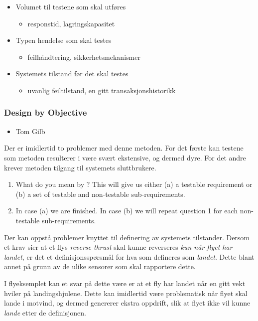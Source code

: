 \begin{itemize}
\item
  Volumet til testene som skal utføres
  \begin{itemize}
  \item
    responstid, lagringskapasitet
  \end{itemize}
\item
  Typen hendelse som skal testes
  \begin{itemize}
  \item
    feilhåndtering, sikkerhetsmekanismer
  \end{itemize}
\item
  Systemets tilstand før det skal testes
  \begin{itemize}
  \item
    uvanlig feiltilstand, en gitt transaksjonshistorikk
  \end{itemize}
\end{itemize}
\subsubsection{Design by Objective}

\begin{itemize}
\item
  Tom Gilb
\end{itemize}
Der er imidlertid to problemer med denne metoden. For det første kan
testene som metoden resulterer i være svært ekstensive, og dermed dyre.
For det andre krever metoden tilgang til systemets sluttbrukere.

\begin{enumerate}[1.]
\item
  What do you mean by ? This will give us either (a) a testable
  requirement or (b) a set of testable and non-testable
  sub-requirements.
\item
  In case (a) we are finished. In case (b) we will repeat question 1 for
  each non-testable sub-requirements.
\end{enumerate}
Der kan oppstå problemer knyttet til definering av systemets tilstander.
Dersom et krav sier at et flys \emph{reverse thrust} skal kunne
reverseres \emph{kun når flyet har landet}, er det et
definisjonsspørsmål for hva som defineres som \emph{landet}. Dette blant
annet på grunn av de ulike sensorer som skal rapportere dette.

I flyeksemplet kan et svar på dette være er at et fly har landet når en
gitt vekt hviler på landingshjulene. Dette kan imidlertid være
problematisk når flyet skal lande i motvind, og dermed genererer ekstra
oppdrift, slik at flyet ikke vil kunne \emph{lande} etter de
definisjonen.

